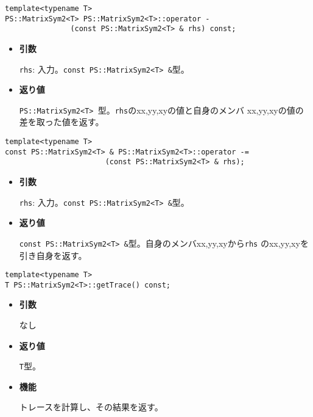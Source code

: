\begin{screen}
\begin{verbatim}
template<typename T>
PS::MatrixSym2<T> PS::MatrixSym2<T>::operator - 
               (const PS::MatrixSym2<T> & rhs) const;
\end{verbatim}
\end{screen}

\begin{itemize}

\item{{\bf 引数}}

{\tt rhs}: 入力。{\tt const PS::MatrixSym2<T> \&}型。

\item{{\bf 返り値}}

{\tt PS::MatrixSym2<T> }型。{\tt rhs}のxx,yy,xyの値と自身のメンバ
xx,yy,xyの値の差を取った値を返す。

\end{itemize}

\begin{screen}
\begin{verbatim}
template<typename T>
const PS::MatrixSym2<T> & PS::MatrixSym2<T>::operator -= 
                       (const PS::MatrixSym2<T> & rhs);
\end{verbatim}
\end{screen}

\begin{itemize}

\item{{\bf 引数}}

{\tt rhs}: 入力。{\tt const PS::MatrixSym2<T> \&}型。

\item{{\bf 返り値}}

{\tt const PS::MatrixSym2<T> \&}型。自身のメンバxx,yy,xyから{\tt rhs}
のxx,yy,xyを引き自身を返す。

\end{itemize}


\begin{screen}
\begin{verbatim}
template<typename T>
T PS::MatrixSym2<T>::getTrace() const;
\end{verbatim}
\end{screen}

\begin{itemize}

\item{{\bf 引数}}

なし

\item{{\bf 返り値}}

{\tt T}型。

\item{{\bf 機能}}

  トレースを計算し、その結果を返す。

\end{itemize}

